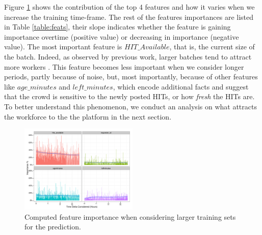 Figure \ref{fig:importances} shows the  contribution of the top 4 features and how it varies  when we increase the training time-frame. The rest of the features importances are listed in Table \ref{table:feats}, their slope indicates whether the feature is gaining importance overtime (positive value) or decreasing in importance (negative value).
The most important feature is $HIT\_Available$, that is, the current size of the batch. Indeed, as observed by previous work, larger batches tend to attract more workers \cite{mturk,crowddb}. This feature becomes less important when we consider longer periods, partly because of noise, but, most importantly, because of other features like $age\_minutes$ and $left\_minutes$, which encode additional facts and suggest that the crowd is sensitive to the newly posted HITs, or how \emph{fresh} the HITs are. To better understand this phenomenon, we conduct an analysis on what attracts the workforce to the the platform in the next section.

\begin{figure}[htb]
	\centering
		\includegraphics[width=0.5\textwidth]{figures/importances}
	\caption{Computed feature importance when considering larger training sets for the prediction.}
	\label{fig:importances}
\end{figure}



